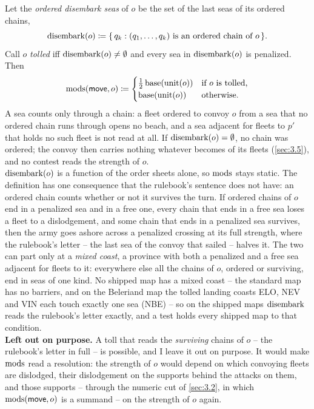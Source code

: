 \documentclass[12pt,a4paper]{article}
\begin{document}
\begin{itemize}
Let the \emph{ordered disembark seas} of $o$ be the set of the last seas of its ordered chains,
\[
\operatorname{disembark}(o) \coloneqq \{\, q_k : (q_1, \dots, q_k) \text{ is an ordered chain of } o \,\}.
\]
Call $o$ \emph{tolled} iff $\operatorname{disembark}(o) \ne \emptyset$ and every sea in $\operatorname{disembark}(o)$ is penalized.
Then
\[
\operatorname{mods}(\mathsf{move}, o) \coloneqq
\begin{cases}
\tfrac{1}{2}\operatorname{base}(\operatorname{unit}(o)) & \text{if } o \text{ is tolled,} \\
\operatorname{base}(\operatorname{unit}(o)) & \text{otherwise.}
\end{cases}
\]
A sea counts only through a chain: a fleet ordered to convoy $o$ from a sea that no ordered chain runs through opens no beach, and a sea adjacent for fleets to $p'$ that holds no such fleet is not read at all.
If $\operatorname{disembark}(o) = \emptyset$, no chain was ordered; the convoy then carries nothing whatever becomes of its fleets (\cref{sec:3.5}), and no contest reads the strength of $o$.\\
$\operatorname{disembark}(o)$ is a function of the order sheets alone, so $\operatorname{mods}$ stays static.
The definition has one consequence that the rulebook's sentence does not have: an ordered chain counts whether or not it survives the turn.
If ordered chains of $o$ end in a penalized sea and in a free one, every chain that ends in a free sea loses a fleet to a dislodgement, and some chain that ends in a penalized sea survives, then the army goes ashore across a penalized crossing at its full strength, where the rulebook's letter -- the last sea of the convoy that sailed -- halves it.
The two can part only at a \emph{mixed coast}, a province with both a penalized and a free sea adjacent for fleets to it: everywhere else all the chains of $o$, ordered or surviving, end in seas of one kind.
No shipped map has a mixed coast -- the standard map has no barriers, and on the Beleriand map the tolled landing coasts ELO, NEV and VIN each touch exactly one sea (NBE) -- so on the shipped maps $\operatorname{disembark}$ reads the rulebook's letter exactly, and a test holds every shipped map to that condition.\\
\textbf{Left out on purpose.}
A toll that reads the \emph{surviving} chains of $o$ -- the rulebook's letter in full -- is possible, and I leave it out on purpose.
It would make $\operatorname{mods}$ read a resolution: the strength of $o$ would depend on which convoying fleets are dislodged, their dislodgement on the supports behind the attacks on them, and those supports -- through the numeric cut of \cref{sec:3.2}, in which $\operatorname{mods}(\mathsf{move}, o)$ is a summand -- on the strength of $o$ again.

\end{itemize}
\end{document}
